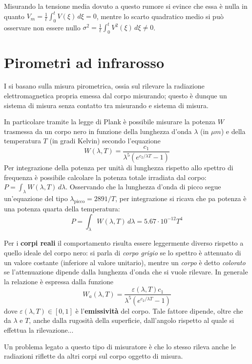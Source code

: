 	
	Misurando la tensione media dovuto a questo rumore si evince che essa è nulla in quanto $V_m = \frac 1 t \int_0 ^t V(\xi)\, d\xi =0$, mentre lo scarto quadratico medio si può osservare non essere nullo $\sigma^2 = \frac 1 t \int_0 ^t V^2 (\xi)\, d\xi \neq 0$.
	
	
\section{Pirometri ad infrarosso}
	I  si basano sulla misura pirometrica, ossia sul rilevare la radiazione elettromagnetica propria emessa dal corpo misurando; questo è dunque un sistema di misura senza contatto tra misurando e sistema di misura. 
	
	In particolare tramite la legge di Plank è possibile misurare la potenza $W$ trasmessa da un corpo nero in funzione della lunghezza d'onda $\lambda$ (in $\mu m$) e della temperatura $T$ (in gradi Kelvin) secondo l'equazione
	\[ W(\lambda, T) =  \frac{ c_1  }{\lambda^5\left(e^{c_2/\lambda T} - 1\right)}\]
	Per integrazione della potenza per unità di lunghezza rispetto allo spettro di frequenza è possibile calcolare la potenza totale irradiata dal corpo: $P = \int_\lambda W(\lambda, T)\, d\lambda$. Osservando che la lunghezza d'onda di picco segue un'equazione del tipo $\lambda_\textrm{picco} = 2891/T$, per integrazione si ricava che pa potenza è una potenza quarta della temperatura:
	\[ P =\int_\lambda W(\lambda, T)\, d\lambda = 5.67  \cdot 10^{-12} T^4 \]
	
	Per i \textbf{corpi reali} il comportamento risulta essere leggermente diverso rispetto a quello ideale del corpo nero: si parla di \textit{corpo grigio} se lo spettro è attenuato di un valore costante (inferiore al valore unitario), mentre un \textit{corpo} è detto \textit{colorato} se l'attenuazione dipende dalla lunghezza d'onda che si vuole rilevare. In generale la relazione è espressa dalla funzione
	\[ W_a(\lambda, T) =\frac{\varepsilon(\lambda,T) c_1}{\lambda^5\left(e^{c_2/\lambda T} - 1\right)} \]
	dove $\varepsilon(\lambda, T) \in [0,1]$ è l'\textbf{emissività} del corpo. Tale fattore dipende, oltre che da $\lambda$ e $T$, anche dalla rugosità della superficie, dall'angolo rispetto al quale si effettua la rilevazione... 
	
	Un problema legato a questo tipo di misuratore è che lo stesso rileva anche le radiazioni riflette da altri corpi sul corpo oggetto di misura.
	
	